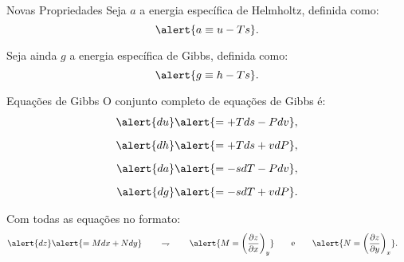     \begin{frame}{Novas Propriedades}\vspace*{-1em}
        Seja \alert{$a$} a energia específica de \alert{Helmholtz}, definida como:
        \begin{equation*}
            \alert{a \equiv u - Ts}.
        \end{equation*}

        Seja ainda \alert{$g$} a energia específica de \alert{Gibbs}, definida como:
        \begin{equation*}
            \alert{g \equiv h - Ts}.
        \end{equation*}
    \end{frame}

    \begin{frame}{Equações de Gibbs}\vspace*{-0em}
        O conjunto completo de equações de Gibbs é:
        \begin{align*}
            \alert{du} &\alert{= +Tds - Pdv},
            \\[\medskipamount]
            \alert{dh} &\alert{= +Tds + vdP},
            \\[\medskipamount]
            \alert{da} &\alert{= -sdT - Pdv},
            \\[\medskipamount]
            \alert{dg} &\alert{= -sdT + vdP}.
        \end{align*}

        \vspace*\medskipamount

        Com \alert{todas} as equações no formato:
        \begin{align*}
            \alert{dz} &\alert{= Mdx + Ndy}
            \qquad\rightharpoondown\qquad
            \alert{M =
                \left(
                    \frac{\partial z}{\partial x}
                \right)_y}
            \qquad\mbox{e}\qquad
            \alert{N =
                \left(
                    \frac{\partial z}{\partial y}
                \right)_x}.
        \end{align*}
    \end{frame}

